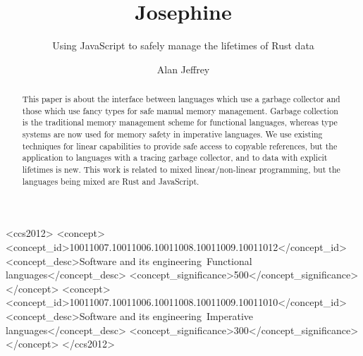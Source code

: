 \documentclass[acmsmall]{acmart}
\begin{document}
\title{Josephine}
\subtitle{Using JavaScript to safely manage the lifetimes of Rust data}

\author{Alan Jeffrey}

\begin{abstract}
This paper is about the interface between languages
which use a garbage collector and those which use fancy
types for safe manual memory management.
Garbage collection is the traditional memory management
scheme for functional languages, whereas type systems
are now used for memory safety in imperative languages.
We use existing techniques for linear capabilities
to provide safe access to copyable references,
but the application to languages
with a tracing garbage collector,
and to data with explicit lifetimes is new.
This work is related to mixed linear/non-linear
programming, but the languages being mixed are Rust and JavaScript.
\end{abstract}

\begin{CCSXML}
<ccs2012>
<concept>
<concept_id>10011007.10011006.10011008.10011009.10011012</concept_id>
<concept_desc>Software and its engineering~Functional languages</concept_desc>
<concept_significance>500</concept_significance>
</concept>
<concept>
<concept_id>10011007.10011006.10011008.10011009.10011010</concept_id>
<concept_desc>Software and its engineering~Imperative languages</concept_desc>
<concept_significance>300</concept_significance>
</concept>
</ccs2012>
\end{CCSXML}



\renewcommand\footnotetextcopyrightpermission[1]{}
\maketitle
\thispagestyle{empty}









\end{document}
